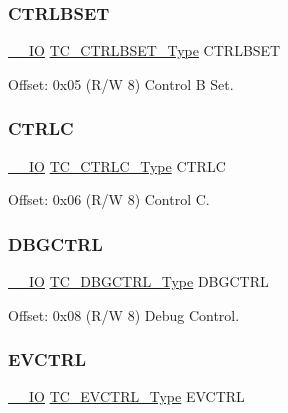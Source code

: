 \subsubsection{\texorpdfstring{CTRLBSET}{CTRLBSET}}
{\footnotesize\ttfamily \mbox{\hyperlink{core__cm0plus_8h_aec43007d9998a0a0e01faede4133d6be}{\+\_\+\+\_\+\+IO}} \mbox{\hyperlink{union_t_c___c_t_r_l_b_s_e_t___type}{T\+C\+\_\+\+C\+T\+R\+L\+B\+S\+E\+T\+\_\+\+Type}} C\+T\+R\+L\+B\+S\+ET}



Offset\+: 0x05 (R/W 8) Control B Set. 

\mbox{\label{struct_tc_count8_ac5a6e57255482215b0d11685290ea67a}} 
\subsubsection{\texorpdfstring{CTRLC}{CTRLC}}
{\footnotesize\ttfamily \mbox{\hyperlink{core__cm0plus_8h_aec43007d9998a0a0e01faede4133d6be}{\+\_\+\+\_\+\+IO}} \mbox{\hyperlink{union_t_c___c_t_r_l_c___type}{T\+C\+\_\+\+C\+T\+R\+L\+C\+\_\+\+Type}} C\+T\+R\+LC}



Offset\+: 0x06 (R/W 8) Control C. 

\mbox{\label{struct_tc_count8_ad7d3dc3cf041a0c2b409cdc6a0511ef8}} 
\subsubsection{\texorpdfstring{DBGCTRL}{DBGCTRL}}
{\footnotesize\ttfamily \mbox{\hyperlink{core__cm0plus_8h_aec43007d9998a0a0e01faede4133d6be}{\+\_\+\+\_\+\+IO}} \mbox{\hyperlink{union_t_c___d_b_g_c_t_r_l___type}{T\+C\+\_\+\+D\+B\+G\+C\+T\+R\+L\+\_\+\+Type}} D\+B\+G\+C\+T\+RL}



Offset\+: 0x08 (R/W 8) Debug Control. 

\mbox{\label{struct_tc_count8_a5c530ba15b26365374f61a17c7cf5058}} 
\subsubsection{\texorpdfstring{EVCTRL}{EVCTRL}}
{\footnotesize\ttfamily \mbox{\hyperlink{core__cm0plus_8h_aec43007d9998a0a0e01faede4133d6be}{\+\_\+\+\_\+\+IO}} \mbox{\hyperlink{union_t_c___e_v_c_t_r_l___type}{T\+C\+\_\+\+E\+V\+C\+T\+R\+L\+\_\+\+Type}} E\+V\+C\+T\+RL}



